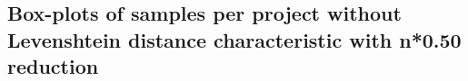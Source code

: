 \begin{appendices}
\section{Box-plots of samples per project without Levenshtein distance characteristic with n*0.50 reduction}
\label{ap:no_distance_50}
\begin{figure}[h]
    \centering
    \qquad
\end{figure}


\end{appendices}
